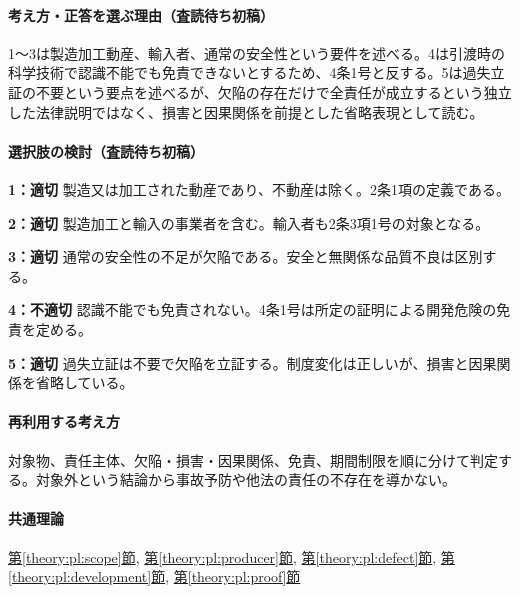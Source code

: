 \paragraph{考え方・正答を選ぶ理由（査読待ち初稿）} 1〜3は製造加工動産、輸入者、通常の安全性という要件を述べる。4は引渡時の科学技術で認識不能でも免責できないとするため、4条1号と反する。5は過失立証の不要という要点を述べるが、欠陥の存在だけで全責任が成立するという独立した法律説明ではなく、損害と因果関係を前提とした省略表現として読む。

\paragraph{選択肢の検討（査読待ち初稿）}\mbox{}\par

\noindent\textbf{1：適切} 製造又は加工された動産であり、不動産は除く。2条1項の定義である。\par

\noindent\textbf{2：適切} 製造加工と輸入の事業者を含む。輸入者も2条3項1号の対象となる。\par

\noindent\textbf{3：適切} 通常の安全性の不足が欠陥である。安全と無関係な品質不良は区別する。\par

\noindent\textbf{4：不適切} 認識不能でも免責されない。4条1号は所定の証明による開発危険の免責を定める。\par

\noindent\textbf{5：適切} 過失立証は不要で欠陥を立証する。制度変化は正しいが、損害と因果関係を省略している。\par

\paragraph{再利用する考え方} 対象物、責任主体、欠陥・損害・因果関係、免責、期間制限を順に分けて判定する。対象外という結論から事故予防や他法の責任の不存在を導かない。

\paragraph{共通理論} \hyperref[theory:pl:scope]{第\ref*{theory:pl:scope}節}, \hyperref[theory:pl:producer]{第\ref*{theory:pl:producer}節}, \hyperref[theory:pl:defect]{第\ref*{theory:pl:defect}節}, \hyperref[theory:pl:development]{第\ref*{theory:pl:development}節}, \hyperref[theory:pl:proof]{第\ref*{theory:pl:proof}節}

